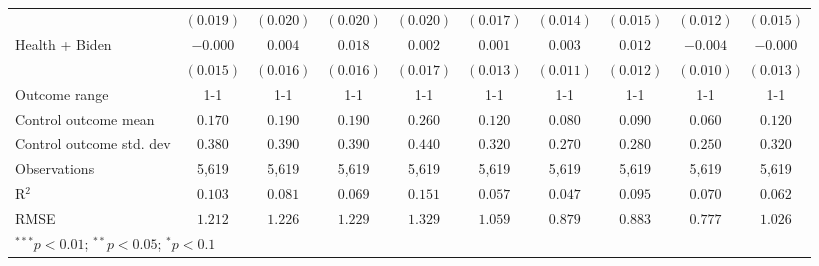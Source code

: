 \begin{table}
\begin{center}
\begin{tabular}{l c c c c c c c c c}
                             & $(0.019)$    & $(0.020)$ & $(0.020)$ & $(0.020)$    & $(0.017)$ & $(0.014)$ & $(0.015)$     & $(0.012)$ & $(0.015)$     \\
Health + Biden               & $-0.000$     & $0.004$   & $0.018$   & $0.002$      & $0.001$   & $0.003$   & $0.012$       & $-0.004$  & $-0.000$      \\
                             & $(0.015)$    & $(0.016)$ & $(0.016)$ & $(0.017)$    & $(0.013)$ & $(0.011)$ & $(0.012)$     & $(0.010)$ & $(0.013)$     \\
\hline
Outcome range                & 1-1          & 1-1       & 1-1       & 1-1          & 1-1       & 1-1       & 1-1           & 1-1       & 1-1           \\
Control outcome mean         & $0.170$      & $0.190$   & $0.190$   & $0.260$      & $0.120$   & $0.080$   & $0.090$       & $0.060$   & $0.120$       \\
Control outcome std. dev     & $0.380$      & $0.390$   & $0.390$   & $0.440$      & $0.320$   & $0.270$   & $0.280$       & $0.250$   & $0.320$       \\
Observations                 & 5,619        & 5,619     & 5,619     & 5,619        & 5,619     & 5,619     & 5,619         & 5,619     & 5,619         \\
R$^{2}$                      & $0.103$      & $0.081$   & $0.069$   & $0.151$      & $0.057$   & $0.047$   & $0.095$       & $0.070$   & $0.062$       \\
RMSE                         & $1.212$      & $1.226$   & $1.229$   & $1.329$      & $1.059$   & $0.879$   & $0.883$       & $0.777$   & $1.026$       \\
\hline
\multicolumn{10}{l}{\scriptsize{$^{***}p<0.01$; $^{**}p<0.05$; $^{*}p<0.1$}}
\end{tabular}
\caption{}
\label{table:Tables and Figures/SI_table14_reasonschange}
\end{center}
\end{table}
